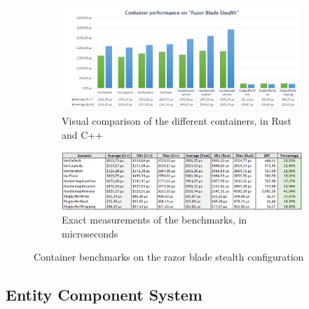 \clearpage

\begin{figure}[h!]
	\centering
	\begin{subfigure}[b]{\textwidth}
		\includegraphics[width=1\linewidth]{PICs/container_bench_blade.png}
		\caption{Visual comparison of the different containers, in Rust and C++}
		\label{fig:Ng1} 
	\end{subfigure}
	
	\begin{subfigure}[b]{\textwidth}
		\includegraphics[width=1\linewidth]{PICs/container_bench_blade_data.png}
		\caption{Exact measurements of the benchmarks, in microseconds}
		\label{fig:Ng2}
	\end{subfigure}
	
	\caption[Container benchmarks blade]{Container benchmarks on the razor blade stealth configuration}
\end{figure}

\clearpage

\subsection{Entity Component System}

